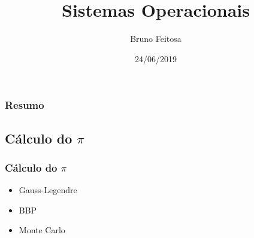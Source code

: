 \documentclass{beamer}
\title[Sistemas Operacionais]{Sistemas Operacionais}
\author{Bruno Feitosa} %
\institute[USP] %
{
Universidade de São Paulo \\ %
\medskip
\textit{feitosa.bruno@usp.com} %
}
\date{24/06/2019} %
\newcommand\safepi[0]{
	\texorpdfstring{$\pi$}{Pi}
}
\begin{document}


\begin{frame}

\titlepage %

\end{frame}


\begin{frame}

\frametitle{Resumo} %
\tableofcontents %

\end{frame}




\begin{frame}

\section{Cálculo do \safepi}
\frametitle{Cálculo do \safepi}

\begin{itemize}
    \item Gauss-Legendre
    \item BBP
    \item Monte Carlo
\end{itemize}

\end{frame}
\end{document}
